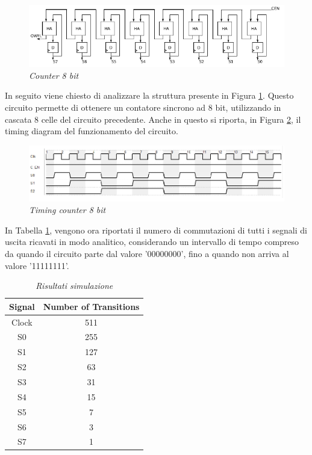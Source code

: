 \begin{figure}[!htb]
	\centering
	\includegraphics[scale=0.6]{immagini/counter2}
	\caption{\textit{Counter 8 bit}}
	\label{counter2}
\end{figure}
In seguito viene chiesto di analizzare la struttura presente in Figura \ref{counter2}. Questo circuito permette di ottenere un contatore sincrono ad 8 bit, utilizzando in cascata 8 celle del circuito precedente. Anche in questo si riporta, in Figura \ref{timing_counter2}, il timing diagram del funzionamento del circuito.
\begin{figure}[!htb]
	\centering
	\includegraphics[scale=0.6]{immagini/timing_counter2}
	\caption{\textit{Timing counter 8 bit}}
	\label{timing_counter2}
\end{figure}
In Tabella \ref{trans_uscita}, vengono ora riportati il numero di commutazioni di tutti i segnali di uscita ricavati in modo analitico, considerando un intervallo di tempo compreso da quando il circuito parte dal valore '00000000', fino a quando non arriva al valore '11111111'.
\begin{table}[!h]\footnotesize
	\centering
	\begin{tabular}{|c|c|}
		\hline
		\textbf{Signal} & \textbf{Number of Transitions}\\
		\hline
		Clock & 511  \\
		S0 &  255 \\
		S1&127\\
		S2& 63\\
		S3& 31\\
		S4& 15\\
		S5& 7\\
		S6& 3\\
		S7& 1\\
		\hline
	\end{tabular}
	\caption{\textit{Risultati simulazione}}
	\label{trans_uscita}
\end{table}\\

